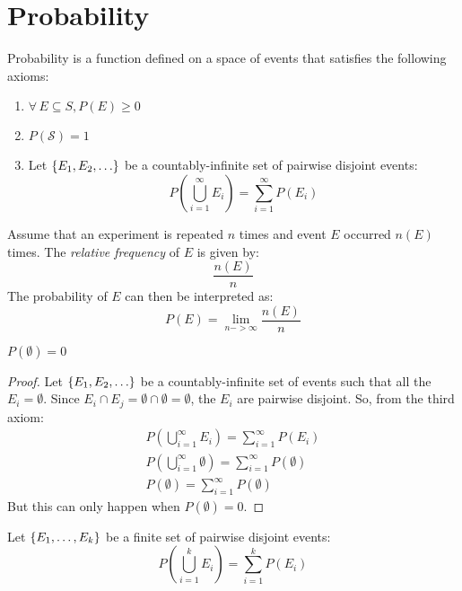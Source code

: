 \documentclass[letterpaper,12pt,fleqn]{article}
\renewcommand{\S}{\mathcal{S}}
\begin{document}
\section*{Probability}

\begin{definition}[Probability]
  Probability is a function defined on a space of events that satisfies the following axioms:
  \begin{enumerate}
  \item \(\forall\,E\subseteq S,P(E)\ge0\)
  \item \(P(\S)=1\)
  \item Let \(\{E_1,E_2,\ldots\}\) be a countably-infinite set of pairwise disjoint events:
    \[P\left(\bigcup_{i=1}^{\infty}E_i\right)=\sum_{i=1}^{\infty}P(E_i)\]
  \end{enumerate}
\end{definition}

\begin{definition}
  Assume that an experiment is repeated \(n\) times and event \(E\) occurred \(n(E)\) times.  The \emph{relative frequency}
  of \(E\) is given by:
  \[\frac{n(E)}{n}\]
  The probability of \(E\) can then be interpreted as:
  \[P(E)=\lim_{n->\infty}\frac{n(E)}{n}\]
\end{definition}

\begin{theorem}
\(P(\emptyset)=0\)
\end{theorem}

\begin{proof}
  Let \(\{E_1,E_2,\ldots\}\) be a countably-infinite set of events such that all the \(E_i=\emptyset\).  Since
  \(E_i\cap E_j=\emptyset\cap\emptyset=\emptyset\), the \(E_i\) are pairwise disjoint.  So, from the third axiom:
  \begin{gather*}
    P(\bigcup_{i=1}^{\infty}E_i)=\sum_{i=1}^{\infty}P(E_i) \\
    P(\bigcup_{i=1}^{\infty}\emptyset)=\sum_{i=1}^{\infty}P(\emptyset) \\
    P(\emptyset)=\sum_{i=1}^{\infty}P(\emptyset)
  \end{gather*}
  But this can only happen when \(P(\emptyset)=0\).
\end{proof}

\begin{theorem}
  Let \(\{E_1,\ldots,E_k\}\) be a finite set of pairwise disjoint events:
  \[P\left(\bigcup_{i=1}^kE_i\right)=\sum_{i=1}^kP(E_i)\]
\end{theorem}
\end{document}

